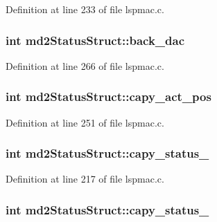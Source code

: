 Definition at line 233 of file lspmac.\-c.

\hypertarget{structmd2StatusStruct_a33ce490348c8de255cf49b96469d3d4e}{
\subsubsection[{back\-\_\-dac}]{\setlength{\rightskip}{0pt plus 5cm}int md2\-Status\-Struct\-::back\-\_\-dac}}\label{structmd2StatusStruct_a33ce490348c8de255cf49b96469d3d4e}


Definition at line 266 of file lspmac.\-c.

\hypertarget{structmd2StatusStruct_ae25122a6db146501b51609b9cb59b044}{
\subsubsection[{capy\-\_\-act\-\_\-pos}]{\setlength{\rightskip}{0pt plus 5cm}int md2\-Status\-Struct\-::capy\-\_\-act\-\_\-pos}}\label{structmd2StatusStruct_ae25122a6db146501b51609b9cb59b044}


Definition at line 251 of file lspmac.\-c.

\hypertarget{structmd2StatusStruct_a7f4e945e80b1980b9e69366a69ad79cc}{
\subsubsection[{capy\-\_\-status\-\_\-1}]{\setlength{\rightskip}{0pt plus 5cm}int md2\-Status\-Struct\-::capy\-\_\-status\-\_}}\label{structmd2StatusStruct_a7f4e945e80b1980b9e69366a69ad79cc}


Definition at line 217 of file lspmac.\-c.

\hypertarget{structmd2StatusStruct_a5d7c10d9a16ebcc53ac4a0770ab2ef62}{
\subsubsection[{capy\-\_\-status\-\_\-2}]{\setlength{\rightskip}{0pt plus 5cm}int md2\-Status\-Struct\-::capy\-\_\-status\-\_}}\label{structmd2StatusStruct_a5d7c10d9a16ebcc53ac4a0770ab2ef62}



